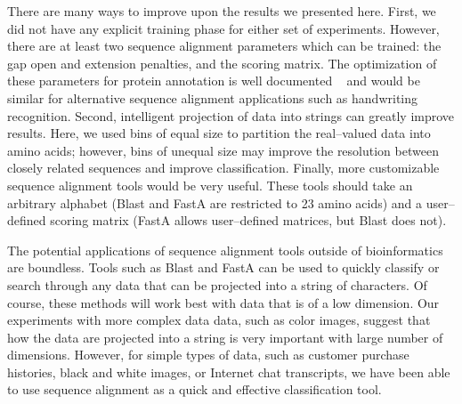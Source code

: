 		There are many ways to improve upon the results we presented here.
		First, we did not have any explicit training phase for either set of experiments.
		However, there are at least two sequence alignment parameters which can
		be trained: the gap open and extension penalties, and the scoring matrix.
		The optimization of these parameters for protein annotation is well documented
		~\cite{henikoff1993performance,altschul1991amino,henikoff1992aminoacid,dayhoff1979amodel,vogt1995assessment,henikoff2000amino}
		and would be similar for alternative sequence alignment applications such
		as handwriting recognition.  Second, intelligent projection of data
		into strings can greatly improve results.  Here, we used bins of equal
		size to partition the real--valued data into amino acids; however, bins
		of unequal size may improve the resolution between closely related sequences
		and improve classification.  Finally, more customizable sequence alignment tools
		would be very useful.  These tools should take an arbitrary alphabet (Blast
		and FastA are restricted to 23 amino acids) and a user--defined scoring
		matrix (FastA allows user--defined matrices, but Blast does not).

		The potential applications of sequence alignment tools
		outside of bioinformatics are boundless.  Tools such as Blast
		and FastA can be used to quickly classify or search through
		any data that can be projected into a string of characters.
		Of course, these methods will work best with data that is
		of a low dimension.  Our experiments with more complex data
		data, such as color images, suggest that how the data are
		projected into a string is very important with large number
		of dimensions.	However, for simple types of data, such
		as customer purchase histories, black and white images, or
		Internet chat transcripts, we have been able to use sequence
		alignment as a quick and effective classification tool.

